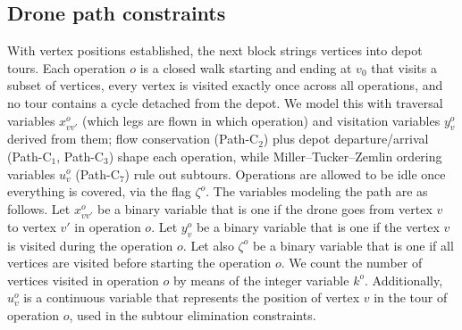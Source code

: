 \documentclass[12pt]{elsarticle}
\begin{document}
\subsection{Drone path constraints}
With vertex positions established, the next block strings vertices into depot tours. Each operation $o$ is a closed walk starting and ending at $v_0$ that visits a subset of vertices, every vertex is visited exactly once across all operations, and no tour contains a cycle detached from the depot. We model this with traversal variables $x_{vv'}^o$ (which legs are flown in which operation) and visitation variables $y_v^o$ derived from them; flow conservation (Path-C$_2$) plus depot departure/arrival (Path-C$_1$, Path-C$_3$) shape each operation, while Miller--Tucker--Zemlin ordering variables $u_v^o$ (Path-C$_7$) rule out subtours. Operations are allowed to be idle once everything is covered, via the flag $\zeta^o$. The variables modeling the path are as follows. Let $x_{vv'}^o$ be a binary variable that is one if the drone goes from vertex $v$ to vertex $v'$ in operation $o$. Let $y_v^o$ be a binary variable that is one if the vertex $v$ is visited during the operation $o$. Let also $\zeta^o$ be a binary variable that is one if all vertices are visited before starting the operation $o$. We count the number of vertices visited in operation $o$ by means of the integer variable $k^o$. Additionally, $u_v^o$ is a continuous variable that represents the position of vertex $v$ in the tour of operation $o$, used in the subtour elimination constraints.
\end{document}
